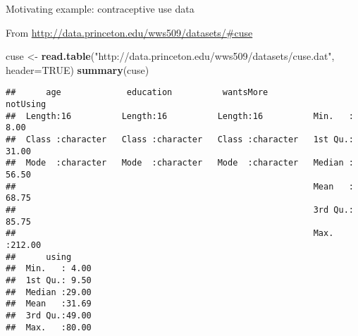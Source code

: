 \documentclass[
  ignorenonframetext,
]{beamer}
\newenvironment{Shaded}{\begin{snugshade}}{\end{snugshade}}
\newcommand{\DataTypeTok}[1]{\textcolor[rgb]{0.13,0.29,0.53}{#1}}
\newcommand{\KeywordTok}[1]{\textcolor[rgb]{0.13,0.29,0.53}{\textbf{#1}}}
\newcommand{\NormalTok}[1]{#1}
\newcommand{\OtherTok}[1]{\textcolor[rgb]{0.56,0.35,0.01}{#1}}
\newcommand{\StringTok}[1]{\textcolor[rgb]{0.31,0.60,0.02}{#1}}
\begin{document}
\begin{frame}[fragile]{Motivating example: contraceptive use data}
\protect\hypertarget{motivating-example-contraceptive-use-data}{}

From \url{http://data.princeton.edu/wws509/datasets/\#cuse}

\tiny

\begin{Shaded}
\begin{Highlighting}[]
\NormalTok{cuse <-}\StringTok{ }\KeywordTok{read.table}\NormalTok{(}\StringTok{"http://data.princeton.edu/wws509/datasets/cuse.dat"}\NormalTok{, }\DataTypeTok{header=}\OtherTok{TRUE}\NormalTok{)}
\KeywordTok{summary}\NormalTok{(cuse)}
\end{Highlighting}
\end{Shaded}

\begin{verbatim}
##      age             education          wantsMore            notUsing     
##  Length:16          Length:16          Length:16          Min.   :  8.00  
##  Class :character   Class :character   Class :character   1st Qu.: 31.00  
##  Mode  :character   Mode  :character   Mode  :character   Median : 56.50  
##                                                           Mean   : 68.75  
##                                                           3rd Qu.: 85.75  
##                                                           Max.   :212.00  
##      using      
##  Min.   : 4.00  
##  1st Qu.: 9.50  
##  Median :29.00  
##  Mean   :31.69  
##  3rd Qu.:49.00  
##  Max.   :80.00
\end{verbatim}

\end{frame}
\end{document}
